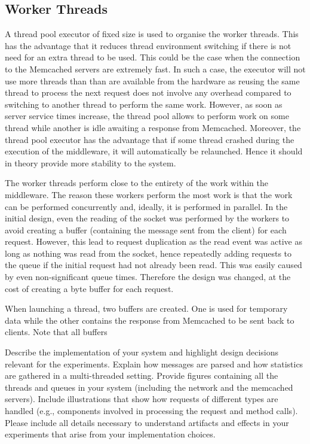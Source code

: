 \documentclass[11pt,a4paper]{article}
\begin{document}
\subsection{Worker Threads}
A thread pool executor of fixed size is used to organise the worker threads. This has the advantage that it reduces thread environment switching if there is not need for an extra thread to be used. This could be the case when the connection to the Memcached servers are extremely fast. In such a case, the executor will not use more threads than than are available from the hardware as reusing the same thread to process the next request does not involve any overhead compared to switching to another thread to perform the same work. However, as soon as server service times increase, the thread pool allows to perform work on some thread while another is idle awaiting a response from Memcached. Moreover, the thread pool executor has the advantage that if some thread crashed during the execution of the middleware, it will automatically be relaunched. Hence it should in theory provide more stability to the system.

The worker threads perform close to the entirety of the work within the middleware. The reason these workers perform the most work is that the work can be performed concurrently and, ideally, it is performed in parallel. In the initial design, even the reading of the socket was performed by the workers to avoid creating a buffer (containing the message sent from the client) for each request. However, this lead to request duplication as the read event was active as long as nothing was read from the socket, hence repeatedly adding requests to the queue if the initial request had not already been read. This was easily caused by even non-significant queue times. Therefore the design was changed, at the cost of creating a byte buffer for each request.

When launching a thread, two buffers are created. One is used for temporary data while the other contains the response from Memcached to be sent back to clients. Note that all buffers









Describe the implementation of your system and highlight design decisions relevant for the experiments. Explain how messages are parsed and how statistics are gathered in a multi-threaded setting. Provide figures containing all the threads and queues in your system (including the network and the memcached servers). Include illustrations that show how requests of different types are handled (e.g., components involved in processing the request and method calls). Please include all details necessary to understand artifacts and effects in your experiments that arise from your implementation choices.
\end{document}
